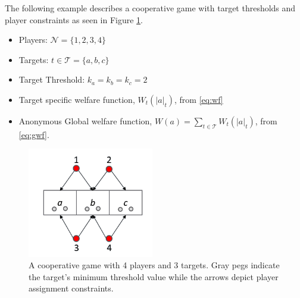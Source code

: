 \documentclass[defaultstyle,12pt]{proposal}
\def\Pl{\mathcal{N}}  %
\def\Ta{\mathcal{T}}  %
\begin{document}
The following example describes a cooperative game with target thresholds and player constraints as seen in Figure \ref{fig:ex1}.
\begin{itemize}
	\item Players: $\Pl = \{1,2,3,4\}$
	\item Targets: $t \in \Ta = \{a, b, c\}$
	\item Target Threshold: $k_a = k_b = k_c = 2$
	\item Target specific welfare function, $W_t(|a|_t)$, from \eqref{eq:wf}
	\item Anonymous Global welfare function, $W(a) = \sum\limits_{t \in \Ta} W_t(|a|_t)$, from \eqref{eq:gwf}.
\end{itemize}
\begin{figure}[!htb]
	\centering\includegraphics[width=5.5cm]{../assets/ex1.png}
	\centering\caption{A cooperative game with 4 players and 3 targets. Gray pegs indicate the target's minimum threshold value while the arrows depict player assignment constraints.}\label{fig:ex1}
\end{figure}
\end{document}
